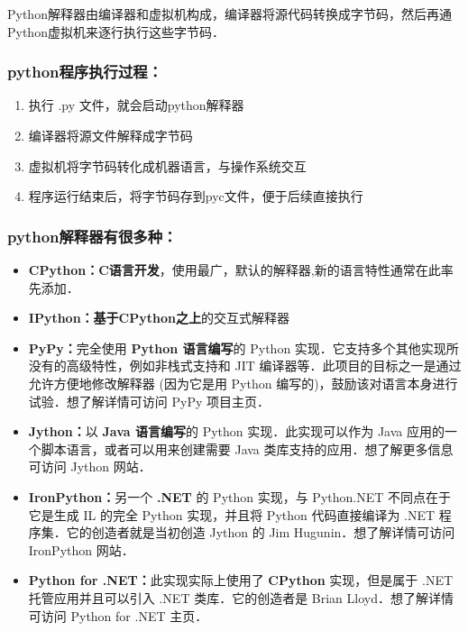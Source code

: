 
\begin{issues}
\issueTODO
\issueDraft
\end{issues}


Python解释器由编译器和虚拟机构成，编译器将源代码转换成字节码，然后再通Python虚拟机来逐行执行这些字节码．

\subsubsection{python程序执行过程：}

\begin{enumerate}
\item 执行 .py 文件，就会启动python解释器

\item 编译器将源文件解释成字节码

\item 虚拟机将字节码转化成机器语言，与操作系统交互

\item 程序运行结束后，将字节码存到pyc文件，便于后续直接执行
\end{enumerate}

\subsubsection{python解释器有很多种：}

\begin{itemize}
\item \textbf{CPython：}\textbf{C语言开发}，使用最广，默认的解释器,新的语言特性通常在此率先添加．

\item \textbf{IPython：}\textbf{基于CPython之上}的交互式解释器

\item \textbf{PyPy：}完全使用 \textbf{Python 语言编写}的 Python 实现．它支持多个其他实现所没有的高级特性，例如非栈式支持和 JIT 编译器等．此项目的目标之一是通过允许方便地修改解释器 (因为它是用 Python 编写的)，鼓励该对语言本身进行试验．想了解详情可访问 PyPy 项目主页．

\item \textbf{Jython：}以 \textbf{Java 语言编写}的 Python 实现．此实现可以作为 Java 应用的一个脚本语言，或者可以用来创建需要 Java 类库支持的应用．想了解更多信息可访问 Jython 网站．

\item \textbf{IronPython：}另一个 \textbf{.NET} 的 Python 实现，与 Python.NET 不同点在于它是生成 IL 的完全 Python 实现，并且将 Python 代码直接编译为 .NET 程序集．它的创造者就是当初创造 Jython 的 Jim Hugunin．想了解详情可访问 IronPython 网站．

\item \textbf{Python for .NET：}此实现实际上使用了 \textbf{CPython} 实现，但是属于 .NET 托管应用并且可以引入 .NET 类库．它的创造者是 Brian Lloyd．想了解详情可访问 Python for .NET 主页．
\end{itemize}

